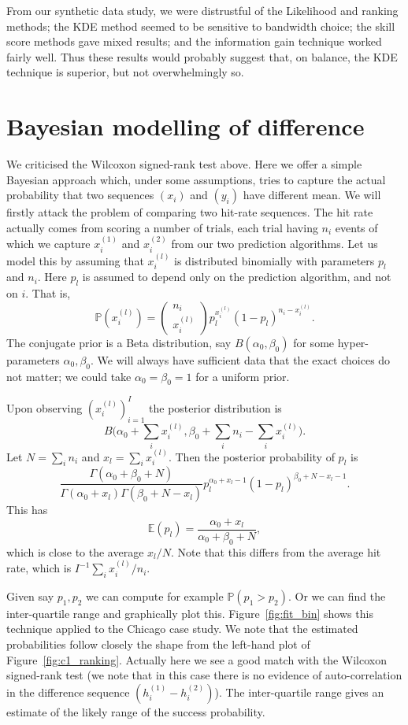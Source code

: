 \documentclass[twoside,a4paper,twocolumn,10pt]{article}
\theoremstyle{plain}
\theoremstyle{definition}
\begin{document}
From our synthetic data study, we were distrustful of the Likelihood and ranking methods;
the KDE method seemed to be sensitive to bandwidth choice; the skill score methods gave
mixed results; and the information gain technique worked fairly well.  Thus these results
would probably suggest that, on balance, the KDE technique is superior, but not
overwhelmingly so.





\section{Bayesian modelling of difference}\label{sec:bay_model_diff}

We criticised the Wilcoxon signed-rank test above.  Here we offer a simple
Bayesian approach which, under some assumptions, tries to capture the actual
probability that two sequences $(x_i)$ and $(y_i)$ have different mean.  We will
firstly attack the problem of comparing two hit-rate sequences.  The hit rate
actually comes from scoring a number of trials, each trial having $n_i$ events of
which we capture $x^{(1)}_i$ and $x^{(2)}_i$ from our two prediction algorithms.
Let us model
this by assuming that $x^{(l)}_i$ is distributed binomially with parameters $p_l$
and $n_i$.  Here $p_l$ is assumed to depend only on the prediction algorithm, and
not on $i$.  That is,
\[ \mathbb P(x^{(l)}_i) = \begin{pmatrix} n_i \\ x^{(l)}_i \end{pmatrix}
p_l^{x^{(l)}_i} (1-p_l)^{n_i - x^{(l)}_i}. \]
The conjugate prior is a Beta distribution, say $B(\alpha_0, \beta_0)$ for some
hyper-parameters $\alpha_0, \beta_0$.  We will always have sufficient data that
the exact choices do not matter; we could take $\alpha_0 = \beta_0 = 1$ for a
uniform prior.

Upon observing $(x^{(l)}_i)_{i=1}^I$ the posterior distribution is
\[ B\big( \alpha_0 + \sum_i x^{(l)}_i, \beta_0 + \sum_i n_i - \sum_i x^{(l)}_i
\big). \]
Let $N = \sum_i n_i$ and $x_l = \sum_i x^{(l)}_i$.  Then the posterior probability
of $p_l$ is
\[ \frac{\Gamma(\alpha_0+\beta_0+N)}{\Gamma(\alpha_0+x_l) \Gamma(\beta_0+N-x_l)}
p_l^{\alpha_0+x_l-1} (1-p_l)^{\beta_0+N-x_l-1}. \]
This has
\[ \mathbb E(p_l) = \frac{\alpha_0+x_l}{\alpha_0+\beta_0+N}, \]
which is close to the average $x_l / N$.  Note that this differs from
the average hit rate, which is $I^{-1} \sum_i x^{(l)}_i / n_i$.

Given say $p_1, p_2$ we can compute for example $\mathbb P(p_1 > p_2)$.  Or we
can find the inter-quartile range and graphically plot this.  
Figure~\ref{fig:fit_bin} shows this technique applied to the Chicago case study.
We note that the estimated probabilities follow closely the shape from the left-hand
plot of Figure~\ref{fig:c1_ranking}.
Actually here we see a good match with the Wilcoxon signed-rank test (we note that
in this case there is no evidence of auto-correlation in the difference sequence
$(h^{(1)}_i - h^{(2)}_i)$).
The inter-quartile range gives an estimate of the likely range of the success probability.
\end{document}

